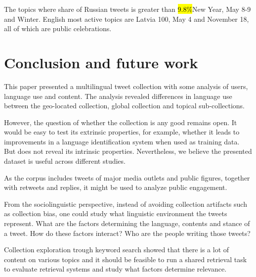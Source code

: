 \documentclass{IOS-Book-Article}
\begin{document}
The topics where share of Russian tweets is greater than \hl{9.8\%}New Year, May 8-9 and Winter. English most active topics are Latvia 100, May 4 and November 18, all of which are public celebrations. 




\section{Conclusion and future work}
\label{sec:conclusion}


This paper presented a multilingual tweet collection with some analysis of users, language use and content. The analysis revealed differences in language use between the geo-located collection, global collection and topical sub-collections.

However, the question of whether the collection is any good remains open. It would be easy to test its extrinsic properties, for example, whether it leads to improvements in a language identification system when used as training data. But does not reveal its intrinsic properties. Nevertheless, we believe the presented dataset is useful across different studies.

As the corpus includes tweets of major media outlets and public figures, together with retweets and replies, it might be used to analyze public engagement.

From the sociolinguistic perspective, instead of avoiding collection artifacts such as collection bias, one could study what linguistic environment the tweets represent. What are the factors determining the language, contents and stance of a tweet. How do these factors interact? Who are the people writing those tweets?

Collection exploration trough keyword search showed that there is a lot of content on various topics and it should be feasible to run a shared retrieval task to evaluate retrieval systems and study what factors determine relevance.





\end{document}
